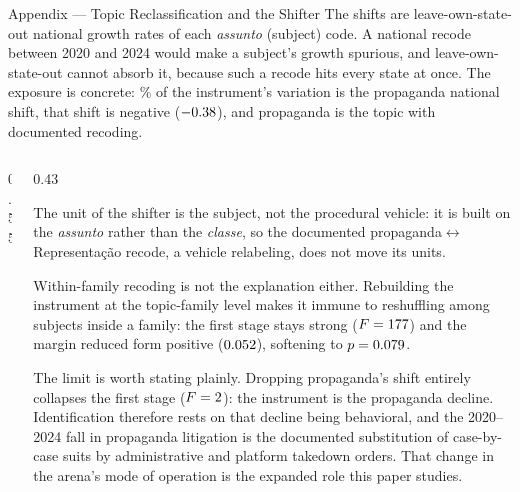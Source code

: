 
\begin{frame}{Appendix --- Topic Reclassification and the Shifter}
\hypertarget{app:reclass}{}
\footnotesize
\noindent The shifts are leave-own-state-out national growth rates of each \emph{assunto} (subject) code. A national recode between 2020 and 2024 would make a subject's growth spurious, and leave-own-state-out cannot absorb it, because such a recode hits every state at once. The exposure is concrete: \RecPropShare\% of the instrument's variation is the propaganda national shift, that shift is negative ($-0.38$), and propaganda is the topic with documented recoding.
\smallskip
\begin{columns}[T]
\begin{column}{0.55\linewidth}
\centering
\resizebox{\linewidth}{!}{}
\end{column}
\begin{column}{0.43\linewidth}
{\scriptsize
The unit of the shifter is the subject, not the procedural vehicle: it is built on the \emph{assunto} rather than the \emph{classe}, so the documented propaganda$\leftrightarrow$Representa\c{c}\~ao recode, a vehicle relabeling, does not move its units.\par
\smallskip
Within-family recoding is not the explanation either. Rebuilding the instrument at the topic-family level makes it immune to reshuffling among subjects inside a family: the first stage stays strong ($F=177$) and the margin reduced form positive ($0.052$), softening to $p=0.079$.\par
\smallskip
The limit is worth stating plainly. Dropping propaganda's shift entirely collapses the first stage ($F=2$): the instrument is the propaganda decline. Identification therefore rests on that decline being behavioral, and the 2020--2024 fall in propaganda litigation is the documented substitution of case-by-case suits by administrative and platform takedown orders. That change in the arena's mode of operation is the expanded role this paper studies.\par}
\end{column}
\end{columns}
\smallskip
\centerline{\hyperlink{app:tdef}{}\quad\hyperlink{src:firststage}{}\quad\hyperlink{src:spine1}{}}
\end{frame}
